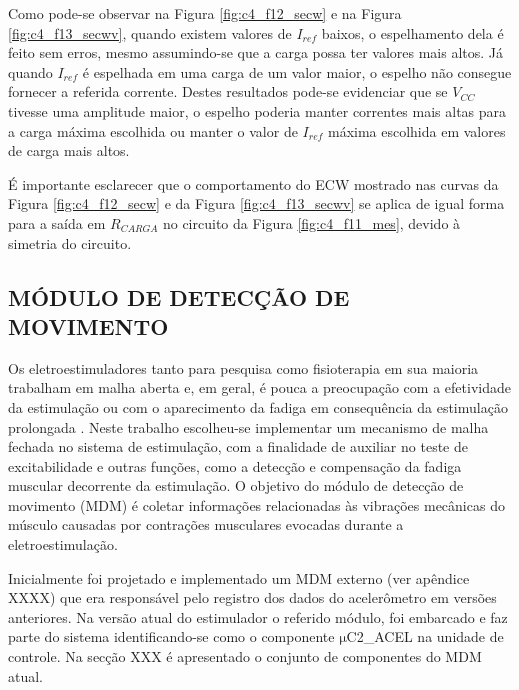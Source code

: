 Como pode-se observar na Figura \ref{fig:c4_f12_secw} e na Figura \ref{fig:c4_f13_secwv}, quando existem valores de $I_{ref}$ baixos, o espelhamento dela é feito sem erros, mesmo assumindo-se que a carga possa ter valores mais altos. Já quando $I_{ref}$ é espelhada em uma carga de um valor maior, o espelho não consegue fornecer a referida corrente. Destes resultados pode-se evidenciar que se $V_{CC}$ tivesse uma amplitude maior, o espelho poderia manter correntes mais altas para a carga máxima escolhida ou manter o valor de $I_{ref}$ máxima escolhida em valores de carga mais altos.

É importante esclarecer que o comportamento do \acrshort{ECW} mostrado nas curvas da Figura \ref{fig:c4_f12_secw} e da Figura \ref{fig:c4_f13_secwv} se aplica de igual forma para a saída em $R_{CARGA}$ no circuito da Figura \ref{fig:c4_f11_mes}, devido à simetria do circuito. 


\subsection{MÓDULO DE DETECÇÃO DE MOVIMENTO} 

Os eletroestimuladores tanto para pesquisa como fisioterapia em sua maioria trabalham em malha aberta e, em geral, é pouca a preocupação com a efetividade da estimulação ou com o aparecimento da fadiga em consequência da estimulação prolongada \cite{Sanches2013}. Neste trabalho escolheu-se implementar um mecanismo de malha fechada no sistema de estimulação, com a finalidade de auxiliar no teste de excitabilidade e outras funções, como a detecção e compensação da fadiga muscular decorrente da estimulação. O objetivo do módulo de detecção de movimento (\acrshort{MDM}) é coletar informações relacionadas às vibrações mecânicas do músculo causadas por contrações musculares evocadas durante a eletroestimulação.




Inicialmente foi projetado e implementado um \acrshort{MDM} externo (ver apêndice XXXX) que era responsável pelo registro dos dados do acelerômetro em versões anteriores. Na versão atual do estimulador o referido módulo, foi embarcado e faz parte do sistema identificando-se como o componente $\mathrm{\mu}$C2\_ACEL na unidade de controle. Na secção XXX é apresentado o conjunto de componentes do \acrshort{MDM} atual.

